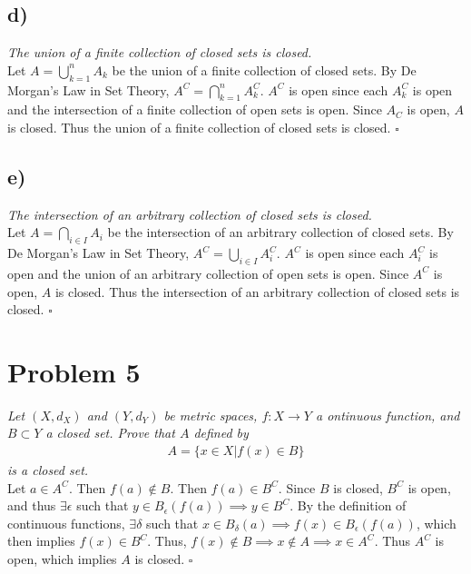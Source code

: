 \documentclass[12pt]{article}
\begin{document}
\subsection*{ d)}
{\it The union of a finite collection of closed sets is closed.} \\

Let $A = \bigcup\limits_{k=1}^{n} A_k$ be the union of a finite collection of closed sets.  By De Morgan's Law in Set Theory, $A^C = \bigcap\limits_{k=1}^{n} A_k^C$.  $A^C$ is open since each $A_k^C$ is open and the intersection of a finite collection of open sets is open.  Since $A_C$ is open, $A$ is closed.  Thus the union of a finite collection of closed sets is closed. \hfill $\square$

\subsection*{ e)}
{\it The intersection of an arbitrary collection of closed sets is closed.} \\

Let $A = \bigcap\limits_{i\in I} A_i$ be the intersection of an arbitrary collection of closed sets.  By De Morgan's Law in Set Theory, $A^C = \bigcup\limits_{i\in I} A_i^C$.  $A^C$ is open since each $A_i^C$ is open and the union of an arbitrary collection of open sets is open.  Since $A^C$ is open, $A$ is closed.  Thus the intersection of an arbitrary collection of closed sets is closed. \hfill $\square$

\section*{Problem 5}
{\it Let $(X, d_X)$ and $(Y, d_Y)$ be metric spaces, $f: X \rightarrow Y$ a ontinuous function, and $B \subset Y$ a closed set.  Prove that $A$ defined by}
\begin{align*}
	A = \{x \in X | f(x) \in B\}
\end{align*}
{\it is a closed set.} \\

Let $a \in A^C$.  Then $f(a) \notin B$.  Then $f(a) \in B^C$.  Since $B$ is closed, $B^C$ is open, and thus $\exists \epsilon$ such that $y \in B_\epsilon(f(a)) \implies y \in B^C$.  By the definition of continuous functions, $\exists \delta$ such that $x \in B_\delta(a) \implies f(x) \in B_\epsilon(f(a))$, which then implies $f(x) \in B^C$.  Thus, $f(x) \notin B \implies x \notin A \implies x \in A^C$.  Thus $A^C$ is open, which implies $A$ is closed. \hfill $\square$
\end{document}
